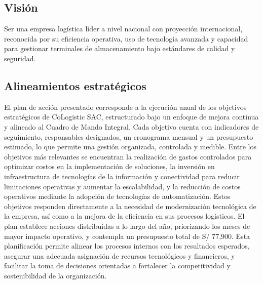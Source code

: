 \documentclass[11pt]{article}
\begin{document}
\subsection{Visión}

Ser una empresa logística líder a nivel nacional con proyección
internacional, reconocida por su eficiencia operativa, uso de tecnología
avanzada y capacidad para gestionar terminales de almacenamiento bajo
estándares de calidad y seguridad.

\subsection{Alineamientos estratégicos}

El plan de acción presentado corresponde a la ejecución anual de los
objetivos estratégicos de CoLogistic SAC, estructurado bajo un enfoque
de mejora continua y alineado al Cuadro de Mando Integral. Cada objetivo
cuenta con indicadores de seguimiento, responsables designados, un
cronograma mensual y un presupuesto estimado, lo que permite una gestión
organizada, controlada y medible. Entre los objetivos más relevantes se
encuentran la realización de gastos controlados para optimizar costos en
la implementación de soluciones, la inversión en infraestructura de
tecnologías de la información y conectividad para reducir limitaciones
operativas y aumentar la escalabilidad, y la reducción de costos
operativos mediante la adopción de tecnologías de automatización. Estos
objetivos responden directamente a la necesidad de modernización
tecnológica de la empresa, así como a la mejora de la eficiencia en sus
procesos logísticos. El plan establece acciones distribuidas a lo largo
del año, priorizando los meses de mayor impacto operativo, y contempla
un presupuesto total de S/ 77,900. Esta planificación permite alinear
los procesos internos con los resultados esperados, asegurar una
adecuada asignación de recursos tecnológicos y financieros, y facilitar
la toma de decisiones orientadas a fortalecer la competitividad y
sostenibilidad de la organización.
\end{document}
